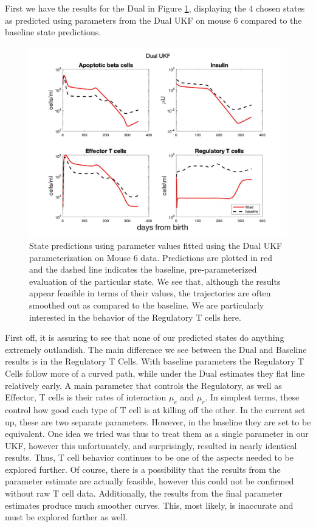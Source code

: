 First we have the results for the Dual in Figure \ref{fig:T1D_UKF_StateSubsets_WithWave}, displaying the 4 chosen states as predicted using parameters from the Dual UKF on mouse 6 compared to the baseline state predictions.
\begin{figure}[H] 
    \centering
    \includegraphics[width=15cm]{Kalman_Filter_Images/T1D_StateSubsets_DualBaselineOverlay.jpg}
    \caption{State predictions using parameter values fitted using the Dual UKF parameterization on Mouse 6 data. Predictions are plotted in red and the dashed line indicates the baseline, pre-parameterized evaluation of the particular state. We see that, although the results appear feasible in terms of their values, the trajectories are often smoothed out as compared to the baseline. We are particularly interested in the behavior of the Regulatory T cells here.}
    \label{fig:T1D_UKF_StateSubsets_WithWave}
\end{figure}
First off, it is assuring to see that none of our predicted states do anything extremely outlandish. The main difference we see between the Dual and Baseline results is in the Regulatory T Cells. With baseline parameters the Regulatory T Cells follow more of a curved path, while under the Dual estimates they flat line relatively early. A main parameter that controls the Regulatory, as well as Effector, T cells is their rates of interaction $\mu_e$ and $\mu_r$. In simplest terms, these control how good each type of T cell is at killing off the other. In the current set up, these are two separate parameters. However, in the baseline they are set to be equivalent. One idea we tried was thus to treat them as a single parameter in our UKF, however this unfortunately, and surprisingly, resulted in nearly identical results. Thus, T cell behavior continues to be one of the aspects needed to be explored further. Of course, there is a possibility that the results from the parameter estimate are actually feasible, however this could not be confirmed without raw T cell data. Additionally, the results from the final parameter estimates produce much smoother curves. This, most likely, is inaccurate and must be explored further as well.\\


